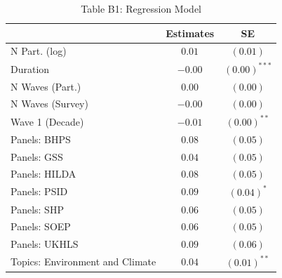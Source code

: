 \documentclass[
  12pt,
]{article}
\begin{document}
\begin{table}[ht]
\begin{center}
\caption*{Table B1: Regression Model} 
\label{tab:sometab}
\begin{tabular}{l c c}
\hline
 & Estimates & SE \\
\hline
N Part. (log)                                       & $0.01$        
                                                    & $(0.01)$      \\
Duration                                            & $-0.00$ 
                                                    & $(0.00)^{***}$ \\
N Waves (Part.)                                     & $0.00$        
                                                    & $(0.00)$      \\
N Waves (Survey)                                    & $-0.00$       
                                                    & $(0.00)$      \\
Wave 1 (Decade)                                     & $-0.01$  
                                                    & $(0.00)^{**}$  \\
Panels: BHPS                                        & $0.08$        
                                                    & $(0.05)$      \\
Panels: GSS                                         & $0.04$        
                                                    & $(0.05)$      \\
Panels: HILDA                                       & $0.08$        
                                                    & $(0.05)$      \\
Panels: PSID                                        & $0.09$    
                                                    & $(0.04)^{*}$  \\
Panels: SHP                                         & $0.06$        
                                                    & $(0.05)$      \\
Panels: SOEP                                        & $0.06$        
                                                    & $(0.05)$      \\
Panels: UKHLS                                       & $0.09$        
                                                    & $(0.06)$      \\
Topics: Environment and Climate                     & $0.04$   
                                                    & $(0.01)^{**}$      \\

\end{tabular}
\end{center}
\end{table}
\end{document}
